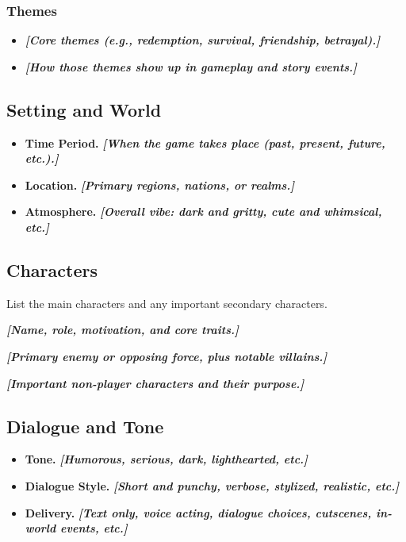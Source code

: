 \documentclass[12pt]{article}
\newcommand{\placeholder}[1]{\textbf{\textit{[#1]}}}
\begin{document}
\subsubsection*{Themes}

\begin{itemize}
    \item \placeholder{Core themes (e.g., redemption, survival, friendship, betrayal).}
    \item \placeholder{How those themes show up in gameplay and story events.}
\end{itemize}

\subsection{Setting and World}

\begin{itemize}
    \item \textbf{Time Period.} \placeholder{When the game takes place (past, present, future, etc.).}
    \item \textbf{Location.} \placeholder{Primary regions, nations, or realms.}
    \item \textbf{Atmosphere.} \placeholder{Overall vibe: dark and gritty, cute and whimsical, etc.}
\end{itemize}

\subsection{Characters}

List the main characters and any important secondary characters.

\begin{description}[leftmargin=3.2cm, labelsep=0.8cm, style=nextline]
    \item[Protagonist(s)]
        \placeholder{Name, role, motivation, and core traits.}
    \item[Antagonists]
        \placeholder{Primary enemy or opposing force, plus notable villains.}
    \item[NPCs]
        \placeholder{Important non-player characters and their purpose.}
\end{description}

\subsection{Dialogue and Tone}

\begin{itemize}
    \item \textbf{Tone.} \placeholder{Humorous, serious, dark, lighthearted, etc.}
    \item \textbf{Dialogue Style.} \placeholder{Short and punchy, verbose, stylized, realistic, etc.}
    \item \textbf{Delivery.} \placeholder{Text only, voice acting, dialogue choices, cutscenes, in-world events, etc.}
\end{itemize}
\end{document}
